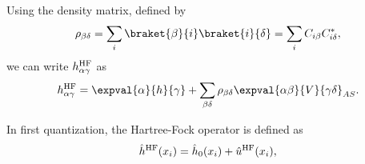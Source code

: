 Using the density matrix, defined by
\begin{equation*}
    \rho_{\beta\delta} = \sum_{i} \braket{\beta}{i} \braket{i}{\delta} = \sum_{i} C_{i\beta} C_{i\delta}^*,
\end{equation*}
we can write $h_{\alpha \gamma}^{\mathrm{HF}}$ as
\begin{equation*}
    h_{\alpha \gamma}^\HF = \expval{\alpha}{h}{\gamma} + \sum_{\beta\delta} \rho_{\beta\delta} \expval{\alpha\beta}{V}{\gamma\delta}_{AS}.
\end{equation*}

In first quantization, the Hartree-Fock operator is defined as
\begin{equation*}
    \hat{h}^{\mathrm{HF}}(x_i) = \hat{h}_0(x_i) + \hat{u}^{\mathrm{HF}}(x_i),
\end{equation*}


